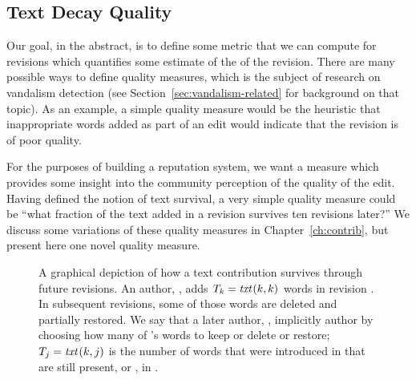 \subsection{Text Decay Quality}

Our goal, in the abstract, is to define some metric that we can compute for
revisions which quantifies some estimate of the  of the
revision.
There are many possible ways to define quality measures, which is the
subject of research on vandalism detection (see
Section~\ref{sec:vandalism-related} for background on that topic).
As an example, a simple quality measure would be the heuristic that
inappropriate words added as part of an edit would indicate that the revision
is of poor quality.

For the purposes of building a reputation system, we want a measure
which provides some insight into the community perception of the
quality of the edit.
Having defined the notion of text survival, a very simple quality measure
could be ``what fraction of the text added in a revision survives
ten revisions later?''
We discuss some variations of these quality measures in
Chapter~\ref{ch:contrib}, but present here one novel quality measure.

\begin{figure}[htbp]
\centering
{}
\caption{A graphical depiction of how a text contribution survives
	through future revisions.
        An author, , adds
    $T_k = \mathit{txt}_{}(k,k)$ words in revision .  In subsequent
    revisions, some of those words are deleted and partially restored.
    We say that a later author, , implicitly 
    author  by choosing how many of 's words
    to keep or delete or restore; $T_j = \mathit{txt}_{}(k,j)$ is the number of words
    that were introduced in  that are still present, or
    , in .
}
\label{fig:textsurvival} 
\end{figure}


